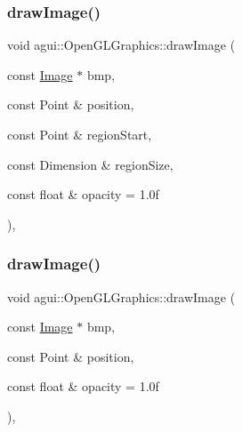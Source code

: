 \subsubsection{\texorpdfstring{draw\+Image()}{drawImage()}\hspace{0.1cm}{\footnotesize\ttfamily [1/2]}}
{\footnotesize\ttfamily void agui\+::\+Open\+G\+L\+Graphics\+::draw\+Image (\begin{DoxyParamCaption}\item[{const \mbox{\hyperlink{class_image}{Image}} $\ast$}]{bmp,  }\item[{const Point \&}]{position,  }\item[{const Point \&}]{region\+Start,  }\item[{const Dimension \&}]{region\+Size,  }\item[{const float \&}]{opacity = {\ttfamily 1.0f} }\end{DoxyParamCaption})\hspace{0.3cm}{\ttfamily [override]}, {\ttfamily [virtual]}}

\mbox{\label{classagui_1_1_open_g_l_graphics_a1fca808a081e0afe94fe7b94d8f9ed6f}} 
\subsubsection{\texorpdfstring{draw\+Image()}{drawImage()}\hspace{0.1cm}{\footnotesize\ttfamily [2/2]}}
{\footnotesize\ttfamily void agui\+::\+Open\+G\+L\+Graphics\+::draw\+Image (\begin{DoxyParamCaption}\item[{const \mbox{\hyperlink{class_image}{Image}} $\ast$}]{bmp,  }\item[{const Point \&}]{position,  }\item[{const float \&}]{opacity = {\ttfamily 1.0f} }\end{DoxyParamCaption})\hspace{0.3cm}{\ttfamily [override]}, {\ttfamily [virtual]}}

\mbox{\label{classagui_1_1_open_g_l_graphics_a4123aa29ef3c9610fc121f3e52cb5e60}} 
